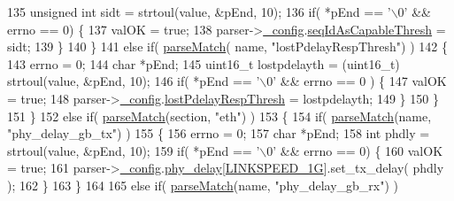 \begin{DoxyCode}
135             \textcolor{keywordtype}{unsigned} \textcolor{keywordtype}{int} sidt = strtoul(value, &pEnd, 10);
136             \textcolor{keywordflow}{if}( *pEnd == \textcolor{charliteral}{'\(\backslash\)0'} && errno == 0) \{
137                 valOK = \textcolor{keyword}{true};
138                 parser->\hyperlink{class_gptp_ini_parser_a8733e97ddaee116e34a67d3e222e45c9}{\_config}.\hyperlink{struct_gptp_ini_parser_1_1gptp__cfg__t_ad640c0854e25c3347a8723f9a0f32edd}{seqIdAsCapableThresh} = sidt;
139             \}
140         \}
141         \textcolor{keywordflow}{else} \textcolor{keywordflow}{if}( \hyperlink{class_gptp_ini_parser_a8465186d2562a5e0c599175104b214ad}{parseMatch}( name, \textcolor{stringliteral}{"lostPdelayRespThresh"}) )
142         \{
143             errno = 0;
144             \textcolor{keywordtype}{char} *pEnd;
145             uint16\_t lostpdelayth = (uint16\_t) strtoul(value, &pEnd, 10);
146             \textcolor{keywordflow}{if}( *pEnd == \textcolor{charliteral}{'\(\backslash\)0'} && errno == 0 ) \{
147                 valOK = \textcolor{keyword}{true};
148                 parser->\hyperlink{class_gptp_ini_parser_a8733e97ddaee116e34a67d3e222e45c9}{\_config}.\hyperlink{struct_gptp_ini_parser_1_1gptp__cfg__t_ab04b7c6ced77ef2b302011ce412ca781}{lostPdelayRespThresh} = lostpdelayth;
149             \}
150         \}
151     \}
152     \textcolor{keywordflow}{else} \textcolor{keywordflow}{if}( \hyperlink{class_gptp_ini_parser_a8465186d2562a5e0c599175104b214ad}{parseMatch}(section, \textcolor{stringliteral}{"eth"}) )
153     \{
154         \textcolor{keywordflow}{if}( \hyperlink{class_gptp_ini_parser_a8465186d2562a5e0c599175104b214ad}{parseMatch}(name, \textcolor{stringliteral}{"phy\_delay\_gb\_tx"}) )
155         \{
156             errno = 0;
157             \textcolor{keywordtype}{char} *pEnd;
158             \textcolor{keywordtype}{int} phdly = strtoul(value, &pEnd, 10);
159             \textcolor{keywordflow}{if}( *pEnd == \textcolor{charliteral}{'\(\backslash\)0'} && errno == 0) \{
160                 valOK = \textcolor{keyword}{true};
161                 parser->\hyperlink{class_gptp_ini_parser_a8733e97ddaee116e34a67d3e222e45c9}{\_config}.\hyperlink{struct_gptp_ini_parser_1_1gptp__cfg__t_afdea28a656b2ebb14b4bb2354f9d7601}{phy\_delay}[\hyperlink{gptp__cfg_8hpp_a42bd5d531a29e5c8a1be5ded1cf27cb3}{LINKSPEED\_1G}].set\_tx\_delay( phdly );
162             \}
163         \}
164 
165         \textcolor{keywordflow}{else} \textcolor{keywordflow}{if}( \hyperlink{class_gptp_ini_parser_a8465186d2562a5e0c599175104b214ad}{parseMatch}(name, \textcolor{stringliteral}{"phy\_delay\_gb\_rx"}) )

\end{DoxyCode}
